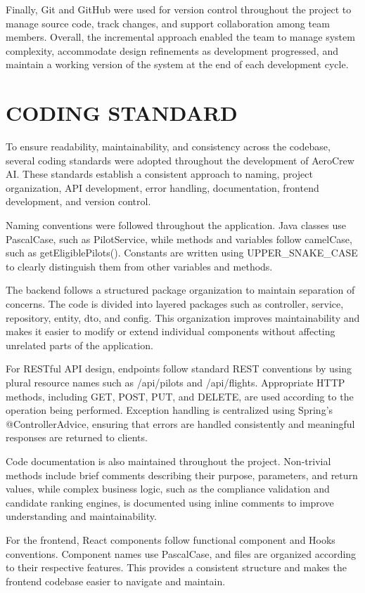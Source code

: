 \documentclass[12pt,a4paper]{report}
\begin{document}
Finally, Git and GitHub were used for version control throughout the project to manage source code, track changes, and support collaboration among team members. Overall, the incremental approach enabled the team to manage system complexity, accommodate design refinements as development progressed, and maintain a working version of the system at the end of each development cycle.


\section{CODING STANDARD}

To ensure readability, maintainability, and consistency across the codebase, several coding standards were adopted throughout the development of AeroCrew AI. These standards establish a consistent approach to naming, project organization, API development, error handling, documentation, frontend development, and version control.

Naming conventions were followed throughout the application. Java classes use PascalCase, such as PilotService, while methods and variables follow camelCase, such as getEligiblePilots(). Constants are written using UPPER_SNAKE_CASE to clearly distinguish them from other variables and methods.

The backend follows a structured package organization to maintain separation of concerns. The code is divided into layered packages such as controller, service, repository, entity, dto, and config. This organization improves maintainability and makes it easier to modify or extend individual components without affecting unrelated parts of the application.

For RESTful API design, endpoints follow standard REST conventions by using plural resource names such as /api/pilots and /api/flights. Appropriate HTTP methods, including GET, POST, PUT, and DELETE, are used according to the operation being performed. Exception handling is centralized using Spring's @ControllerAdvice, ensuring that errors are handled consistently and meaningful responses are returned to clients.

Code documentation is also maintained throughout the project. Non-trivial methods include brief comments describing their purpose, parameters, and return values, while complex business logic, such as the compliance validation and candidate ranking engines, is documented using inline comments to improve understanding and maintainability.

For the frontend, React components follow functional component and Hooks conventions. Component names use PascalCase, and files are organized according to their respective features. This provides a consistent structure and makes the frontend codebase easier to navigate and maintain.
\end{document}

